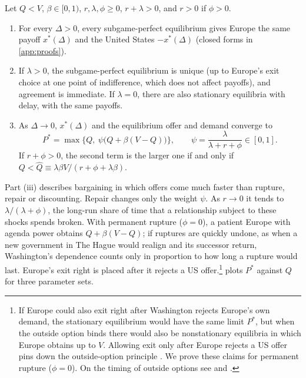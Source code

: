 \begin{proposition}\label{prop:master}
Let $Q<V$, $\beta\in[0,1)$, $r,\lambda,\phi\ge 0$, $r+\lambda>0$, and $r>0$ if $\phi>0$.
\begin{enumerate}[label=(\roman*)]
\item For every $\Delta>0$, every subgame-perfect equilibrium gives Europe the same payoff $x^*(\Delta)$ and the United States $-x^*(\Delta)$ (closed forms in \cref{app:proofs}).
\item If $\lambda>0$, the subgame-perfect equilibrium is unique (up to Europe's exit choice at one point of indifference, which does not affect payoffs), and agreement is immediate. If $\lambda=0$, there are also stationary equilibria with delay, with the same payoffs.
\item As $\Delta\to 0$, $x^*(\Delta)$ and the equilibrium offer and demand converge to
\begin{equation}\label{eq:master}
P^*=\max\big\{Q,\ \psi\big(Q+\beta(V-Q)\big)\big\},\qquad \psi=\frac{\lambda}{\lambda+r+\phi}\in[0,1].
\end{equation}
If $r+\phi>0$, the second term is the larger one if and only if $Q<\hat Q\equiv\lambda\beta V/(r+\phi+\lambda\beta)$.
\end{enumerate}
\end{proposition}

Part (iii) describes bargaining in which offers come much faster than rupture, repair or discounting. Repair changes only the weight $\psi$. As $r\to0$ it tends to $\lambda/(\lambda+\phi)$, the long-run share of time that a relationship subject to these shocks spends broken. With permanent rupture ($\phi=0$), a patient Europe with agenda power obtains $Q+\beta(V-Q)$; if ruptures are quickly undone, as when a new government in The Hague would realign and its successor return, Washington's dependence counts only in proportion to how long a rupture would last. Europe's exit right is placed after it rejects a US offer.\footnote{If Europe could also exit right after Washington rejects Europe's own demand, the stationary equilibrium would have the same limit $P^*$, but when the outside option binds there would also be nonstationary equilibria in which Europe obtains up to $V$. Allowing exit only after Europe rejects a US offer pins down the outside-option principle \citep{binmore1989outside}. We prove these claims for permanent rupture ($\phi=0$). On the timing of outside options see \citet{shaked1994opting} and \citet{ponsati1998rubinstein}.}  plots $P^*$ against $Q$ for three parameter sets.

